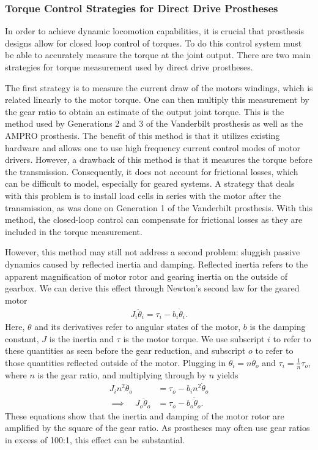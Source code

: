 \subsubsection{Torque Control Strategies for Direct Drive Prostheses}
In order to achieve dynamic locomotion capabilities, it is crucial that
prosthesis designs allow for closed loop control of torques. To do this control
system must be able to accurately measure the torque at the joint output. There
are two main strategies for torque measurement used by direct drive prostheses.

The first strategy is to measure the current draw of the motors windings, which
is related linearly to the motor torque. One can then multiply this measurement
by the gear ratio to obtain an estimate of the output joint torque. This is the
method used by Generations 2 and 3 of the Vanderbilt prosthesis as well as the
AMPRO prosthesis. The benefit of this method is that it utilizes existing
hardware and allows one to use high frequency current control modes of motor
drivers. However, a drawback of this method is that it measures the torque
before the transmission. Consequently, it does not account for frictional
losses, which can be difficult to model, especially for geared systems. A
strategy that deals with this problem is to install load cells in series with
the motor after the transmission, as was done on Generation 1 of the Vanderbilt
prosthesis. With this method, the closed-loop control can compensate for
frictional losses as they are included in the torque measurement. 

However, this method may still not address a second problem: sluggish passive
dynamics caused by reflected inertia and damping. Reflected inertia refers to
the apparent magnification of motor rotor and gearing inertia on the outside of
gearbox.  We can derive this effect through Newton's second law for the geared
motor
\begin{align}
    J_i \ddot{\theta}_i = \tau_i - b_i \dot{\theta}_i.
\end{align}
Here, $\theta$ and its derivatives refer to angular states of the motor, $b$
is the damping constant, $J$ is the inertia and $\tau$ is the motor torque. We
use subscript $i$ to refer to these quantities as seen before the gear
reduction, and subscript $o$ to refer to those quantities reflected outside of
the motor. Plugging in $\theta_i = n \theta_o$ and $\tau_i = \frac{1}{n}
\tau_o$, where $n$ is the gear ratio, and multiplying through by $n$ yields
\begin{align}
    J_i n^2 \ddot{\theta}_o &= \tau_o - b_i n^2 \dot{\theta}_o \\
    \implies \quad J_o \ddot{\theta}_o &= \tau_o - b_o \dot{\theta}_o.
\end{align}
These equations show that the inertia and damping of the motor rotor are
amplified by the square of the gear ratio. As prostheses may often use gear
ratios in excess of 100:1, this effect can be substantial. 

